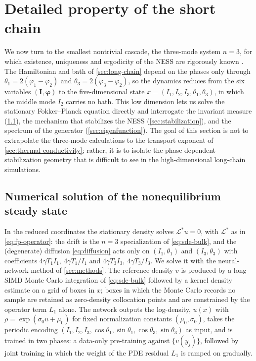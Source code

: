 \documentclass[11pt,a4paper]{article}
\theoremstyle{definition}
\numberwithin{equation}{section}   %
\newcommand{\bI}{\mathbf{I}}
\newcommand{\bphi}{\boldsymbol{\varphi}}
\newcommand{\Ladj}{\mathcal{L}^{*}}
\begin{document}
\section{Detailed property of the short chain}\label{sec:short-chain}

We now turn to the smallest nontrivial cascade, the three-mode system $n=3$,
for which existence, uniqueness and ergodicity of the NESS are rigorously known
\cite{HLNS}. The Hamiltonian and bath of \cref{sec:long-chain} depend on the
phases only through $\theta_1=2(\varphi_1-\varphi_2)$ and
$\theta_3=2(\varphi_3-\varphi_2)$, so the dynamics reduces from the six
variables $(\bI,\bphi)$ to the five-dimensional state
$x=(I_1,I_2,I_3,\theta_1,\theta_3)$, in which the middle mode $I_2$ carries no
bath. This low dimension lets us solve the stationary Fokker--Planck equation
directly and interrogate the invariant measure (\cref{sec:fp-numerics}), the
mechanism that stabilizes the NESS (\cref{sec:stabilization}), and the spectrum
of the generator (\cref{sec:eigenfunction}). The goal of this section is not to
extrapolate the three-mode calculations to the transport exponent of
\cref{sec:thermal-conductivity}; rather, it is to isolate the phase-dependent
stabilization geometry that is difficult to see in the high-dimensional
long-chain simulations.

\subsection{Numerical solution of the nonequilibrium steady state}\label{sec:fp-numerics}

In the reduced coordinates the stationary density solves $\Ladj u=0$, with
$\Ladj$ as in \eqref{eq:fp-operator}: the drift is the $n=3$ specialization of
\eqref{eq:sde-bulk}, and the (degenerate) diffusion \eqref{eq:diffusion} acts
only on $(I_1,\theta_1)$ and $(I_3,\theta_3)$ with coefficients
$4\gamma T_1 I_1,\ 4\gamma T_1/I_1$ and $4\gamma T_3 I_3,\ 4\gamma T_3/I_3$. We
solve it with the neural-network method of \cref{sec:methods}. The reference
density $v$ is produced by a long SIMD Monte Carlo integration of
\eqref{eq:sde-bulk} followed by a kernel density estimate on a grid of boxes in
$x$; boxes in which the Monte Carlo records no sample are retained as
zero-density collocation points and are constrained by the operator term $L_1$
alone. The network outputs the log-density, $u(x)$ with $\rho=\exp(\sigma_0
u+\mu_0)$ for fixed normalization constants $(\mu_0,\sigma_0)$, takes the
periodic encoding $(I_1,I_2,I_3,\cos\theta_1,\sin\theta_1,\cos\theta_3,
\sin\theta_3)$ as input, and is trained in two phases: a data-only pre-training
against $\{v(y_j)\}$, followed by joint training in which the weight of the PDE
residual $L_1$ is ramped on gradually.
\end{document}
